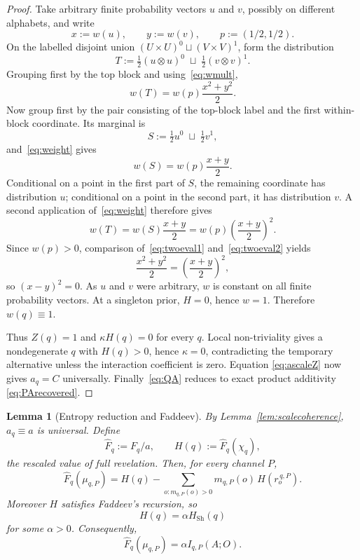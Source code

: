 \documentclass[11pt,a4paper]{article}
\newtheorem{lemma}[theorem]{Lemma}
\theoremstyle{definition}
\newcommand{\Sh}{H_{\mathrm{Sh}}}
\newcommand{\1}{\mathbf 1}
\begin{document}
\begin{proof}
Take arbitrary finite probability vectors $u$ and $v$, possibly on different alphabets, and write
\[
x:=w(u),\qquad y:=w(v),\qquad p:=(1/2,1/2).
\]
On the labelled disjoint union $(U\times U)^0\sqcup(V\times V)^1$, form the distribution
\[
T:=\tfrac12(u\otimes u)^0\;\sqcup\;\tfrac12(v\otimes v)^1.
\]
Grouping first by the top block and using~\eqref{eq:wmult},
\begin{equation}
w(T)=w(p)\frac{x^2+y^2}{2}.
\tag{E1}\label{eq:twoeval1}
\end{equation}
Now group first by the pair consisting of the top-block label and the first within-block coordinate.  Its marginal is
\[
S:=\tfrac12u^0\;\sqcup\;\tfrac12v^1,
\]
and~\eqref{eq:weight} gives
\[
w(S)=w(p)\frac{x+y}{2}.
\]
Conditional on a point in the first part of $S$, the remaining coordinate has distribution $u$; conditional on a point in
the second part, it has distribution $v$.  A second application of~\eqref{eq:weight} therefore gives
\begin{equation}
w(T)=w(S)\frac{x+y}{2}
=w(p)\left(\frac{x+y}{2}\right)^2.
\tag{E2}\label{eq:twoeval2}
\end{equation}
Since $w(p)>0$, comparison of~\eqref{eq:twoeval1} and~\eqref{eq:twoeval2} yields
\[
\frac{x^2+y^2}{2}=\left(\frac{x+y}{2}\right)^2,
\]
so $(x-y)^2=0$.  As $u$ and $v$ were arbitrary, $w$ is constant on all finite probability vectors.  At a singleton prior,
$H=0$, hence $w=1$.  Therefore $w(q)\equiv1$.

Thus $Z(q)=1$ and $\kappa H(q)=0$ for every $q$.  Local non-triviality gives a nondegenerate $q$ with $H(q)>0$, hence
$\kappa=0$, contradicting the temporary alternative unless the interaction coefficient is zero.  Equation
\eqref{eq:ascaleZ} now gives $a_q=C$ universally.  Finally~\eqref{eq:QA} reduces to exact product additivity
\eqref{eq:PArecovered}.
\end{proof}

\begin{lemma}[Entropy reduction and Faddeev]\label{lem:faddeevsketch}
By Lemma~\ref{lem:scalecoherence}, $a_q\equiv a$ is universal.  Define
\[
\widehat F_q:=F_q/a,
\qquad
H(q):=\widehat F_q(\chi_q),
\]
the rescaled value of full revelation.  Then, for every channel $P$,
\[
\widehat F_q(\mu_{q,P})
=
H(q)-\sum_{o:m_{q,P}(o)>0}m_{q,P}(o)\,H(r_o^{\,q,P}).
\tag{ER}
\]
Moreover $H$ satisfies Faddeev's recursion, so
\[
H(q)=\alpha \Sh(q)
\]
for some $\alpha>0$.  Consequently,
\[
\widehat F_q(\mu_{q,P})=\alpha I_{q,P}(A;O).
\]
\end{lemma}
\end{document}
